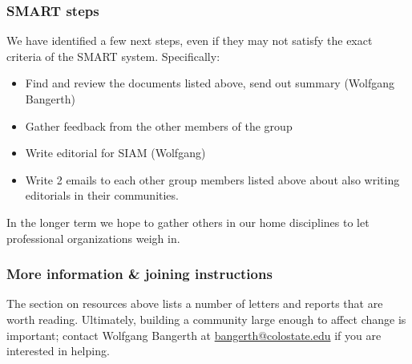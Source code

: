 \subsubsection{SMART steps}

We have identified a few next steps, even if they may not satisfy the
exact criteria of the SMART system. Specifically:
\begin{itemize}
  \item Find and review the documents listed above, send out summary
    (Wolfgang Bangerth)
  \item Gather feedback from the other members of the group
  \item Write editorial for SIAM (Wolfgang)
  \item Write 2 emails to each other group members listed above about
    also writing editorials in their communities.
\end{itemize}
In the longer term we hope to gather others in our home disciplines to
let professional organizations weigh in.


\subsubsection{More information \& joining instructions}

The section on resources above lists a number of letters and reports
that are worth reading. Ultimately, building a community large enough
to affect change is important; contact Wolfgang Bangerth at
\url{bangerth@colostate.edu} if you are interested in helping.
